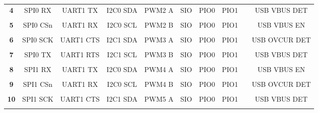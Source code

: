 \documentclass[a4paper,12pt,twoside]{article}
\begin{document}
\begin{center}
{\begin{tabular}{|c|*{9}{c|}}
			\textbf{4}    & SPI0 RX     & UART1 TX    & I2C0 SDA    & PWM2 A      & SIO         & PIO0        & PIO1        &              & USB VBUS DET  \\
			              &             &             &             &             &             &             &             &              &               \\ \hline
			\textbf{5}    & SPI0 CSn    & UART1 RX    & I2C0 SCL    & PWM2 B      & SIO         & PIO0        & PIO1        &              & USB VBUS EN   \\
			              &             &             &             &             &             &             &             &              &               \\ \hline
			\textbf{6}    & SPI0 SCK    & UART1 CTS   & I2C1 SDA    & PWM3 A      & SIO         & PIO0        & PIO1        &              & USB OVCUR DET \\
			              &             &             &             &             &             &             &             &              &               \\ \hline
			\textbf{7}    & SPI0 TX     & UART1 RTS   & I2C1 SCL    & PWM3 B      & SIO         & PIO0        & PIO1        &              & USB VBUS DET  \\
			              &             &             &             &             &             &             &             &              &               \\ \hline
			\textbf{8}    & SPI1 RX     & UART1 TX    & I2C0 SDA    & PWM4 A      & SIO         & PIO0        & PIO1        &              & USB VBUS EN   \\
			              &             &             &             &             &             &             &             &              &               \\ \hline
			\textbf{9}    & SPI1 CSn    & UART1 RX    & I2C0 SCL    & PWM4 B      & SIO         & PIO0        & PIO1        &              & USB OVCUR DET \\
			              &             &             &             &             &             &             &             &              &               \\ \hline
			\textbf{10}   & SPI1 SCK    & UART1 CTS   & I2C1 SDA    & PWM5 A      & SIO         & PIO0        & PIO1        &              & USB VBUS DET  \\
			              &             &             &             &             &             &             &             &              &               \\ \hline

\end{tabular}}
\end{center}
\end{document}
